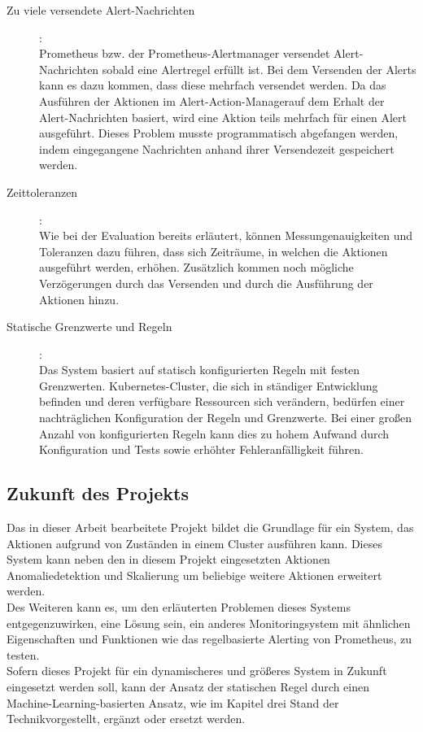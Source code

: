 \documentclass[a4paper,10pt]{scrartcl}
\begin{document}
\begin{description}

\item[Zu viele versendete Alert-Nachrichten]:\\

Prometheus bzw. der Prometheus-Alertmanager versendet Alert-Nachrichten sobald eine Alertregel erfüllt ist. Bei dem Versenden der Alerts kann es dazu kommen, dass diese mehrfach versendet werden. Da das Ausführen der Aktionen im \glqq Alert-Action-Manager\grqq auf dem Erhalt der Alert-Nachrichten basiert, wird eine Aktion teils mehrfach für einen Alert ausgeführt. Dieses Problem musste programmatisch abgefangen werden, indem eingegangene Nachrichten anhand ihrer Versendezeit gespeichert werden.

\item[Zeittoleranzen]:\\

Wie bei der Evaluation bereits erläutert, können Messungenauigkeiten und Toleranzen dazu führen, dass sich Zeiträume, in welchen die Aktionen ausgeführt werden, erhöhen. Zusätzlich kommen noch mögliche Verzögerungen durch das Versenden und durch die Ausführung der Aktionen hinzu.

\item[Statische Grenzwerte und Regeln]:\\

Das System basiert auf statisch konfigurierten Regeln mit festen Grenzwerten. Kubernetes-Cluster, die sich in ständiger Entwicklung befinden und deren verfügbare Ressourcen sich verändern, bedürfen einer nachträglichen Konfiguration der Regeln und Grenzwerte. Bei einer großen Anzahl von konfigurierten Regeln kann dies zu hohem Aufwand durch Konfiguration und Tests sowie erhöhter Fehleranfälligkeit führen.

\end{description}
 
\subsection{Zukunft des Projekts}

Das in dieser Arbeit bearbeitete Projekt bildet die Grundlage für ein System, das Aktionen aufgrund von Zuständen in einem Cluster ausführen kann. Dieses System kann neben den in diesem Projekt eingesetzten Aktionen Anomaliedetektion und Skalierung um beliebige weitere Aktionen erweitert werden.\\
Des Weiteren kann es, um den erläuterten Problemen dieses Systems entgegenzuwirken, eine Lösung sein, ein anderes Monitoringsystem mit ähnlichen Eigenschaften und Funktionen wie das regelbasierte Alerting von Prometheus, zu testen.\\
Sofern dieses Projekt für ein dynamischeres und größeres System in Zukunft eingesetzt werden soll, kann der Ansatz der statischen Regel durch einen \glqq Machine-Learning\grqq -basierten Ansatz, wie im Kapitel drei \glqq Stand der Technik\grqq vorgestellt, ergänzt oder ersetzt werden.
\end{document}
